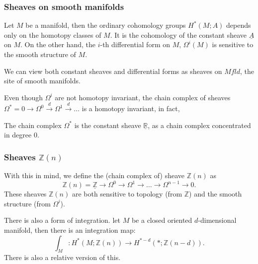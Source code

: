 \documentclass{beamer}
\newcommand{\Mfld}{Mfld}
\newcommand{\Z}{\mathbb Z}
\newcommand{\R}{\mathbb R}
\begin{document}
\begin{frame}
    \frametitle{Sheaves on smooth manifolds}
    Let $M$ be a manifold, then the ordinary cohomology groups  $H^*(M; A)$ depends 
    only on the homotopy classes of $M$. It is the cohomology of the constant sheave 
    $\underline{A}$ on $M$.
    On the other hand, the $i$-th differential form on $M$, $\Omega^i(M)$ is sensitive 
    to the smooth structure of $M$. \pause \vspace{5mm}
    
    We can view both constant sheaves and 
    differential forms as sheaves on $\Mfld$, the site of smooth manifolds. \pause 

    \vspace{5mm}
    Even though $\Omega^i$ are not homotopy invariant, the chain complex of sheaves 
    $\Omega^* = 0 \to \Omega^0 \xrightarrow{d} \Omega^1 \xrightarrow{d} \dots$ is a homotopy invariant,
    in fact,
    \begin{theorem}[de Rham]
        The chain complex $\Omega^*$ is the constant sheave $\underline{\R}$, as a chain complex concentrated in degree 0.
    \end{theorem}
\end{frame}

\begin{frame}
    \frametitle{Sheaves $\Z(n)$}
    With this in mind, we define the (chain complex of) sheave $\Z(n)$ as 
    \begin{equation}
        \Z(n) = \underline{\Z} \to \Omega^0 \to \Omega^1 \to \dots \to \Omega^{n-1} \to 0.
    \end{equation} \pause 
    These sheaves $\Z(n)$ are both sensitive to topology (from $\Z$) and the smooth 
    structure (from $\Omega^i$). \pause \vspace{5mm}

    There is also a form of integration.  let $M$ be a closed oriented $d$-dimensional 
    manifold, then there is an integration map:
    \begin{equation}
        \int_M: H^*(M; \Z(n)) \to H^{*-d}(*; \Z(n-d)).
    \end{equation}
    There is also a relative version of this.
\end{frame}
\end{document}
